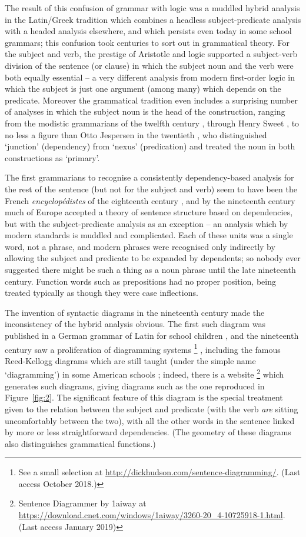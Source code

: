 \documentclass[output=paper]{langscibook}
\begin{document}
The result of this confusion of grammar with logic was a muddled hybrid analysis in the Latin/Greek tradition which combines a headless subject-predicate analysis with a headed analysis elsewhere, and which persists even today in some school grammars; this confusion took centuries to sort out in grammatical theory. For the subject and verb, the prestige of Aristotle and logic supported a subject-verb division of the sentence (or clause) in which the subject noun and the verb were both equally essential – a very different analysis from modern first-order logic in which the subject is just one argument (among many) which depends on the predicate. Moreover the grammatical tradition even includes a surprising number of analyses in which the subject noun is the head of the construction, ranging from the modistic grammarians of the twelfth century \citep[83]{Robins1967}, through Henry Sweet \citep[17]{Sweet1891}, to no less a figure than Otto Jespersen in the twentieth \citep{Jespersen37a-u}, who distinguished ‘junction’ (dependency) from ‘nexus’ (predication) and treated the noun in both constructions as ‘primary’.

The first grammarians to recognise a consistently dependency-based analysis for the rest of the sentence (but not for the subject and verb) seem to have been the French \emph{encyclopédistes} of the eighteenth century \citep{KahaneTBA}, and by the nineteenth century much of Europe accepted a theory of sentence structure based on dependencies, but with the subject-predicate analysis as an exception – an analysis which by modern standards is muddled and complicated. Each of these units was a single word, not a phrase, and modern phrases were recognised only indirectly by allowing the subject and predicate to be expanded by dependents; so nobody ever suggested there might be such a thing as a noun phrase until the late nineteenth century. Function words such as prepositions had no proper position, being treated typically as though they were case inflections.

The invention of syntactic diagrams in the nineteenth century made the inconsistency of the hybrid analysis obvious. The first such diagram was published in a German grammar of Latin for school children \citep{Billroth1832}, and the nineteenth century saw a proliferation of diagramming systems%
%
\footnote{See a small selection at \url{http://dickhudson.com/sentence-diagramming/}. (Last access October 2018.)}%
%
, including the famous Reed-Kellogg diagrams which are still taught (under the simple name ‘diagramming’) in some American schools \citep{RK1877a}; indeed, there is a website%
%
\footnote{Sentence Diagrammer by 1aiway at \url{https://download.cnet.com/windows/1aiway/3260-20_4-10725918-1.html}. (Last access January 2019)}%
%
 which generates such diagrams, giving diagrams such as the one reproduced in Figure~\ref{fig:2}. The significant feature of this diagram is the special treatment given to the relation between the subject and predicate (with the verb \emph{are} sitting uncomfortably between the two), with all the other words in the sentence linked by more or less straightforward dependencies. (The geometry of these diagrams also distinguishes grammatical functions.)
 
\end{document}
